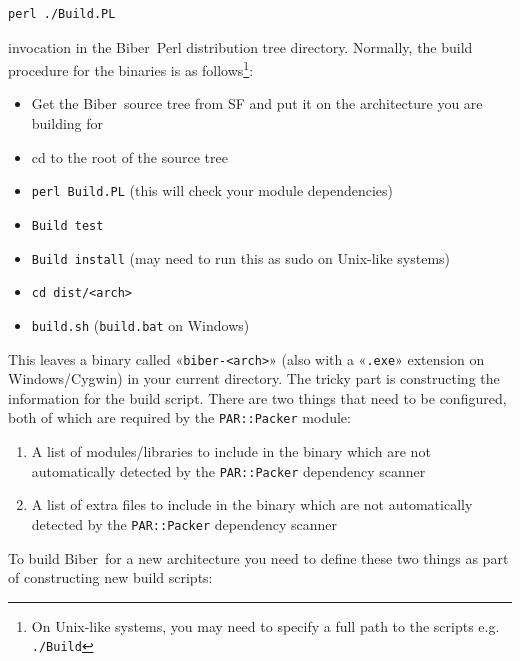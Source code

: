 \documentclass{ltxdockit}
\newcommand*{\biber}{Biber\xspace}
\begin{document}
\begin{verbatim}
perl ./Build.PL
\end{verbatim}

\noindent invocation in the \biber\ Perl distribution tree
directory. Normally, the build procedure for the binaries is as
follows\footnote{On Unix-like systems, you may need to specify a full
  path to the scripts e.g. \texttt{./Build}}:

\begin{itemize}
\item Get the \biber\ source tree from SF and put it on the architecture
  you are building for
\item cd to the root of the source tree
\item \verb+perl Build.PL+ (this will check your module
  dependencies)
\item \verb+Build test+
\item \verb+Build install+ (may need to run this as sudo on
  Unix-like systems)
\item \verb+cd dist/<arch>+
\item \verb+build.sh+ (\verb+build.bat+ on Windows)
\end{itemize}

\noindent This leaves a binary called «\verb+biber-<arch>+» (also with
a «\verb+.exe+» extension on Windows/Cygwin) in your current directory.
The tricky part is constructing the information for the build
script. There are two things that need to be configured, both of
which are required by the \verb+PAR::Packer+ module:

\begin{enumerate}
\item A list of modules/libraries to include in the binary which are not
  automatically detected by the \verb+PAR::Packer+ dependency
  scanner
\item A list of extra files to include in the binary which are not
  automatically detected by the \verb+PAR::Packer+ dependency
  scanner
\end{enumerate}

\noindent To build \biber\ for a new architecture you need to
define these two things as part of constructing new build scripts:
\end{document}
